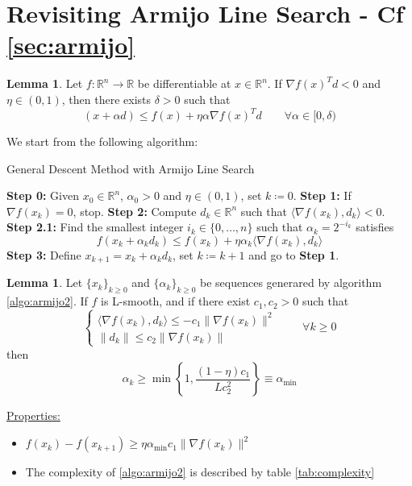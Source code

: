 \documentclass[12pt, openany]{report}
\newcommand{\R}{\mathbb{R}}
\theoremstyle{definition}
\newtheorem{lem}[thm]{Lemma}
\begin{document}
\section{Revisiting Armijo Line Search - Cf \ref{sec:armijo}}
\begin{lem}
    Let $f: \R^n\rightarrow \R$ be differentiable at $x\in \R^n$. If $\nabla f(x)^Td<0$ and $\eta\in (0,1)$, then there exists $\delta >0$ such that 
    \begin{equation}
        (x+\alpha d)\le f(x)+\eta \alpha \nabla f(x)^Td\qquad \forall \alpha \in [0,\delta)
    \end{equation}
\end{lem}
We start from the following algorithm:
\begin{algorithm}
    \caption{General Descent Method with Armijo Line Search}\label{algo:armijo2}
    \begin{algorithmic}[1]
        \State \textbf{Step 0:} Given $x_0\in \R^n$, $\alpha_0>0$ and $\eta \in (0,1)$, set $k\coloneqq 0$.
        \State \textbf{Step 1:} If $\nabla f(x_k)=0$, stop.
        \State \textbf{Step 2:} Compute $d_k \in \R^n$ such that $\langle \nabla f(x_k),d_k\rangle <0$.
        \State \textbf{Step 2.1:} Find the smallest integer $i_k\in \{0,\dots,n\}$ such that $\alpha_k = 2^{-i_k}$ satisfies
        \begin{equation}
            f(x_k+\alpha_kd_k)\le f(x_k) + \eta \alpha_k\langle \nabla f(x_k),d_k\rangle
        \end{equation}
        \State \textbf{Step 3:} Define $x_{k+1}=x_k + \alpha_kd_k$, set $k\coloneqq k+1$ and go to \textbf{Step 1}.
    \end{algorithmic}
\end{algorithm}
\begin{lem}
    Let $\{x_k\}_{k\ge 0}$ and $\{\alpha_k\}_{k\ge 0}$ be sequences generared by algorithm \ref{algo:armijo2}. If $f$ is L-smooth, and if there exist $c_1,c_2>0$ such that 
    \begin{equation}\label{eq:A2}
        \begin{cases}
            \langle \nabla f(x_k),d_k\rangle \le -c_1\lVert \nabla f(x_k)\rVert^2\\
            \lVert d_k\rVert \le c_2 \lVert \nabla f(x_k)\rVert
        \end{cases} \qquad \forall k\ge 0
    \end{equation}
    then
    \begin{equation}
        \alpha_k\ge \min\left\{1, \frac{(1-\eta)c_1}{Lc_2^2}\right\} \equiv \alpha_{\min}
    \end{equation}
\end{lem}
\underline{Properties:}
\begin{itemize}
    \item $f(x_k)-f(x_{k+1})\ge \eta \alpha_{\min} c_1\lVert \nabla f(x_k)\rVert^2$
    \item The complexity of \ref{algo:armijo2} is described by table \ref{tab:complexity}
\end{itemize}
\end{document}
